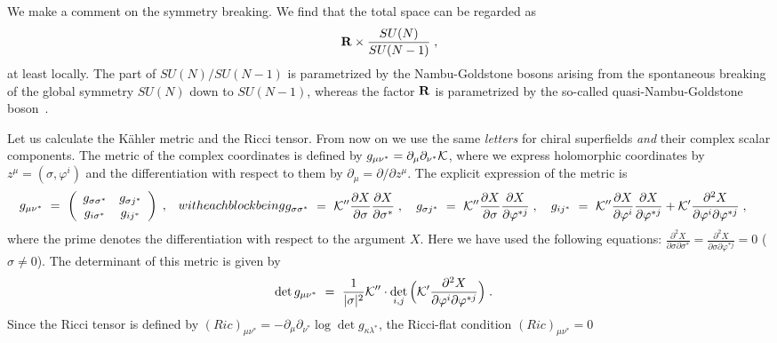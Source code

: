 \documentclass[a4paper,11pt]{article}
\newcommand{\Pd}[2]{\frac{\partial{#1}}{\partial{#2}}}
\newcommand{\del}{\partial}
\newcommand{\kahler}{K\"{a}hler }
\newcommand{\bsubeq}{\begin{subequations}}
\newcommand{\esubeq}{\end{subequations}}
\begin{document}
{We make a comment on the symmetry breaking.
We find that 
the total space can be regarded as 
\begin{align}
{\bf R} \times \frac{SU(N)}{SU(N-1)} \; ,
\end{align}
at least locally.
The part of $SU(N)/SU(N-1)$ is parametrized by the Nambu-Goldstone bosons
arising from the spontaneous breaking of the global symmetry $SU(N)$ down
to $SU(N-1)$,
whereas the factor ${\bf R}$ is parametrized by the so-called
quasi-Nambu-Goldstone boson~\cite{HN1,NLR,Ni1}.

Let us calculate the \kahler metric and the Ricci tensor. From 
now on we use the same {\it letters} for chiral superfields 
{\it and} their complex scalar components.
The metric of the complex coordinates is defined by $g_{\mu
\nu^*} = \del_{\mu} \del_{\nu^*} {\cal K}$, 
where we express
holomorphic coordinates by $z^{\mu} = (\sigma, \varphi^i)$ 
and the differentiation with respect to them  
by $\del_{\mu} = \del / \del z^{\mu}$.
The explicit expression of the metric is
\bsubeq\label{metric}
\begin{align}
g_{\mu \nu^*} \ &= \ \left(
\begin{array}{cc}
g_{\sigma \sigma^*} & g_{\sigma j^*} \\
g_{i \sigma^*} & g_{i j^*}
\end{array} \right) \; ,
\end{align}
with each block being
\begin{align}
g_{\sigma \sigma^*} 
\ &= \ 
{\cal K}'' \Pd{X}{\sigma} \Pd{X}{\sigma^*} \; , \ \ \ 
g_{\sigma j^*} 
\ = \ 
{\cal K}'' \Pd{X}{\sigma} \Pd{X}{\varphi^{*j}} \; , \ \ \
g_{i j^*} 
\ = \ 
{\cal K}'' \Pd{X}{\varphi^i} \Pd{X}{\varphi^{*j}} 
+ {\cal K}' \frac{\del^2 X}{\del \varphi^i \del \varphi^{*j}} \; , 
\end{align}
\esubeq
where the prime denotes the differentiation with respect to
the argument $X$. 
Here we have used the following equations: 
$\frac{\del^2 X}{\del \sigma \del \sigma^*} =
\frac{\del^2 X}{\del \sigma \del \varphi^{*j}} = 0$ ($\sigma \neq 0$).
The determinant of this metric is given by 
\begin{align}
\det g_{\mu \nu^*} 
\ &= \ 
\frac{1}{|\sigma|^2} {\cal K}'' \cdot \det_{i,j} 
\Big( 
{\cal K}' \frac{\del^2 X}{\del \varphi^i \del \varphi^{*j}} 
\Big) \; . \label{metric-determinant}
\end{align}
Since the Ricci tensor is defined 
by $(Ric)_{\mu \nu^*} = - \del_{\mu}
\del_{\nu^*} \log \det g_{\kappa \lambda^*}$, 
the Ricci-flat condition $(Ric)_{\mu \nu^*} = 0$ 
}
\end{document}
